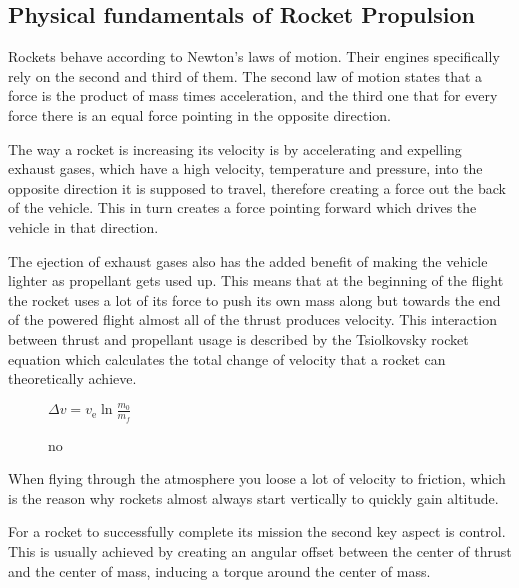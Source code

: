 \subsection{Physical fundamentals of Rocket Propulsion}

Rockets behave according to Newton's laws of motion. Their engines specifically rely on the second and third of them. The second law of motion states that a force is the product of mass times acceleration, and the third one that for every force there is an equal force pointing in the opposite direction. 

The way a rocket is increasing its velocity is by accelerating and expelling exhaust gases, which have a high velocity, temperature and pressure, into the opposite direction it is supposed to travel, therefore creating a force out the back of the vehicle. This in turn creates a force pointing forward which drives the vehicle in that direction.

The ejection of exhaust gases also has the added benefit of making the vehicle lighter as propellant gets used up. This means that at the beginning of the flight the rocket uses a lot of its force to push its own mass along but towards the end of the powered flight almost all of the thrust produces velocity.
This interaction between thrust and propellant usage is described by the Tsiolkovsky rocket equation which calculates the total change of velocity that a rocket can theoretically achieve.

\begin{figure}
$\Delta v=v_{\text{e}}\ln {\frac {m_{0}}{m_{f}}}$

\caption{no}
\end{figure}

When flying through the atmosphere you loose a lot of velocity to friction, which is the reason why rockets almost always start vertically to quickly gain altitude.

For a rocket to successfully complete its mission the second key aspect is control. This is usually achieved by creating an angular offset between the center of thrust and the center of mass, inducing a torque around the center of mass.




